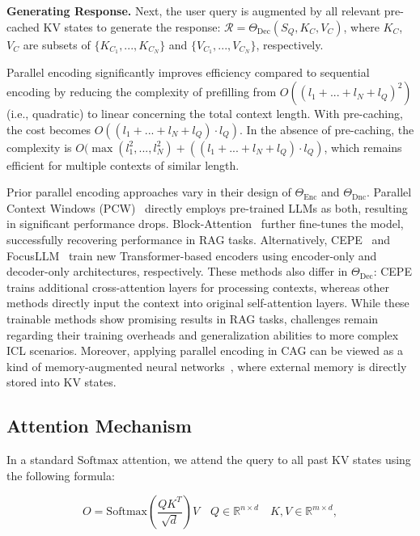 \textbf{Generating Response.} Next, the user query is augmented by all relevant pre-cached KV states to generate the response:
$\mathcal{R} = \Theta_{\text{Dec}}(S_{Q}, K_{C}, V_{C})$, where $K_{C}$, $V_{C}$ are subsets of $\{K_{C_1}, ..., K_{C_N}\}$ and $\{V_{C_1}, ..., V_{C_N}\}$, respectively.

Parallel encoding significantly improves efficiency compared to sequential encoding by reducing the complexity of prefilling from $O((l_1+...+l_N+l_Q)^2)$ (i.e., quadratic) to linear concerning the total context length. With pre-caching, the cost becomes $O((l_1+...+l_N+l_Q)\cdot l_Q)$. In the absence of pre-caching, the complexity is $O(\max(l_1^2, ..., l_N^2)+((l_1+...+l_N+l_Q)\cdot l_Q)$, which remains efficient for multiple contexts of similar length.


Prior parallel encoding approaches vary in their design of $\Theta_{\text{Enc}}$ and $\Theta_{\text{Dnc}}$. Parallel Context Windows (PCW)~\citep{ratner2022parallel} directly employs pre-trained LLMs as both, resulting in significant performance drops. Block-Attention~\citep{Sun2024BlockAttentionFE} further fine-tunes the model, successfully recovering performance in RAG tasks. Alternatively, CEPE~\citep{yen2024long} and FocusLLM~\citep{li2024focusllm} train new Transformer-based encoders using encoder-only and decoder-only architectures, respectively. These methods also differ in $\Theta_{\text{Dec}}$: CEPE trains additional cross-attention layers for processing contexts, whereas other methods directly input the context into original self-attention layers. While these trainable methods show promising results in RAG tasks, challenges remain regarding their training overheads and generalization abilities to more complex ICL scenarios. Moreover, applying parallel encoding in CAG can be viewed as a kind of memory-augmented neural networks~\citep{burtsev2020memory, de2021mention, fevry2020entities}, where external memory is directly stored into KV states.

\subsection{Attention Mechanism}

In a standard $\mathrm{Softmax}$ attention, we attend the query to all past KV states using the following formula:

\begin{equation}
    O = \mathrm{Softmax}(\frac{QK^T}{\sqrt{d}})V \quad Q\in \mathbb{R}^{n \times d} \quad K,V \in \mathbb{R}^{m \times d},
    \label{eq:attention}
\end{equation}

